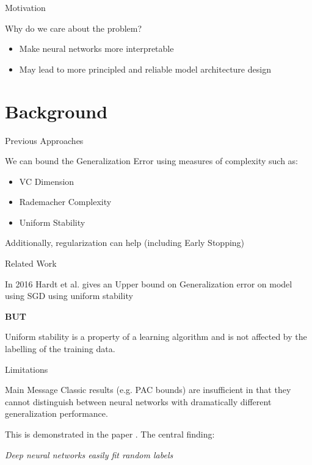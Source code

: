 \documentclass[10pt]{beamer}
\begin{document}
\begin{frame}{Motivation}
\begin{center}
	Why do we care about the problem?
\end{center}
\begin{itemize}
	\item Make neural networks more interpretable
	\item May lead to more principled and reliable model architecture design
\end{itemize}


\end{frame}	

\section{Background}

\begin{frame}{Previous Approaches}
	
We can bound the Generalization Error using measures of complexity such as:
\begin{itemize}
	\item VC Dimension 
	\item Rademacher Complexity
	\item Uniform Stability
\end{itemize}
Additionally, regularization can help (including Early Stopping)
\end{frame}	

\begin{frame}{Related Work}

In 2016 Hardt et al. gives an Upper bound on Generalization error on model using SGD using uniform stability \cite{DBLP:journals/corr/HardtRS15}

\textbf{BUT}

Uniform stability is a property of a learning algorithm and is not affected by the labelling of the training data.

\end{frame}

\begin{frame}{Limitations}
\begin{alertblock}{Main Message}
	Classic results (e.g. PAC bounds) are insufficient in that they cannot distinguish between neural networks with dramatically different generalization performance.
\end{alertblock}

This is demonstrated in the paper \cite{DBLP:journals/corr/ZhangBHRV16}. The central finding:

\begin{center}
	\emph{Deep neural networks easily fit random labels}
\end{center}

\end{frame}	
\end{document}
